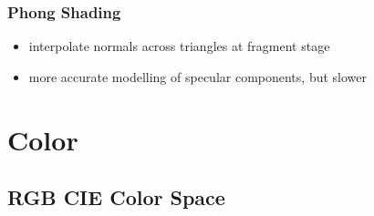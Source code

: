 \documentclass[twocolumn,landscape,10pt]{article}
\theoremstyle{definition}
\begin{document}
\subsubsection{Phong Shading}

\begin{itemize}
    \item interpolate normals across triangles at fragment stage
    \item more accurate modelling of specular components, but slower
\end{itemize} 


\section{Color}

\subsection{RGB CIE Color Space}
\end{document}
